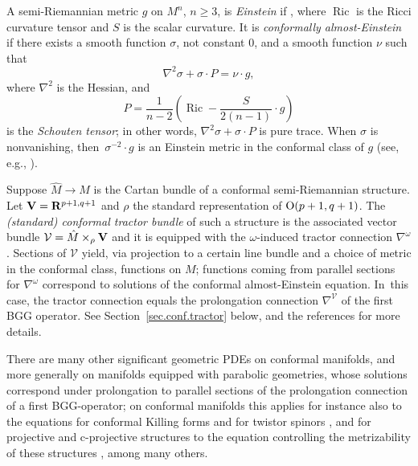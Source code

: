 \documentclass[pdftex]{sigma}
\numberwithin{equation}{section}
\theoremstyle{definition}
\newcommand{\BR}{{\bf R}}
\begin{document}
A semi-Riemannian metric $g$ on $M^n$, $n \geq 3$, is \emph{Einstein}
if , where $\operatorname{Ric}$ is the Ricci
curvature tensor and $S$ is the scalar curvature.
It is \emph{conformally almost-Einstein} if there exists a
smooth function $\sigma$, not constant $0$, and a smooth function $\nu$ such that
\begin{equation}
\label{eqn.conf.einstein}
 \nabla^2 \sigma + \sigma \cdot P = \nu \cdot g,
 \end{equation}
 where $\nabla^2$ is the Hessian, and
 \[
 P = \frac{1}{n-2} \left( \operatorname{Ric} - \frac{S}{2(n-1)} \cdot g \right)
 \]
is the \emph{Schouten tensor}; in other words, $\nabla^2 \sigma +
\sigma \cdot P$ is pure trace. When $\sigma$ is nonvanishing,
then~${\sigma^{-2} \cdot g}$ is an Einstein metric in the conformal class of $g$
(see, e.g., \cite[Proposition~3.6]{curry.gover.tractors}).

Suppose $\hat{M} \rightarrow M$ is the Cartan bundle of a conformal
semi-Riemannian structure. Let ${\bf V} = \BR^{p+1,q+1}$
and $\rho$ the standard representation of ${\rm O}(p+1,q+1)$. The
\emph{(standard) conformal tractor bundle} of such a structure is the associated
vector bundle $\mathcal{V} = \hat{M} \times_\rho {\bf V}$ and it is equipped with the $\omega$-induced tractor connection $\nabla^{\omega}$.
Sections of
$\mathcal{V}$ yield, via projection to a certain line bundle
and a choice of metric in the conformal class,
functions on $M$; functions coming from parallel sections for
$\nabla^{\mathcal{\omega}}$ correspond to
solutions of the conformal almost-Einstein equation. In~this case, the
tractor connection equals the prolongation connection $\nabla^{\mathcal V}$ of the first BGG operator.
See Section~\ref{sec.conf.tractor} below, and the references \cite{cap.gover.tractor.calc, curry.gover.tractors} for more details.

 There are many other significant geometric PDEs on conformal manifolds, and more generally on manifolds equipped with parabolic geometries, whose solutions correspond under prolongation
 to parallel sections of the prolongation connection of a first BGG-operator; on conformal manifolds this applies for instance also to the equations for conformal Killing forms \cite{GoverSilhan, Semmelmann} and for twistor spinors \cite{BFGK}, and for projective and
 c-projective structures to the equation controlling the metrizability of these structures \cite{cemn.cproj, eastwood.matveev.proj.tractor}, among many others.
\end{document}

